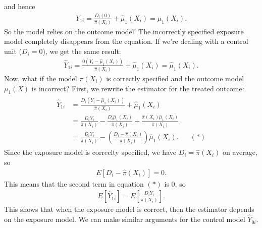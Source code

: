 \documentclass[letterpaper,10pt,english]{jupyterBook}
\begin{document}
\sphinxAtStartPar
and hence
\begin{equation*}
\begin{split}\hat Y_{1i} = \frac{D_i(0)}{\hat \pi (X_i)} + \hat \mu_1(X_i) = \hat \mu_1(X_i).\end{split}
\end{equation*}
\sphinxAtStartPar
So the model relies  on the outcome model! The incorrectly specified exposure model completely disappears from the equation. If we’re dealing with a control unit (\(D_i=0\)), we get the same result:
\begin{equation*}
\begin{split}\hat Y_{1i} = \frac{0(Y_i - \hat \mu_1 (X_i))}{\hat \pi (X_i)} + \hat \mu_1(X_i) = \hat \mu_1(X_i).\end{split}
\end{equation*}
\sphinxAtStartPar
Now, what if the  model \(\pi(X_i)\) is correctly specified and the outcome model \(\mu_1(X)\) is incorrect? First, we rewrite the estimator for the treated outcome:
\begin{equation*}
\begin{split}\begin{aligned}
\hat Y_{1i}& = \frac{D_i(Y_i - \hat \mu_1 (X_i))}{\hat \pi (X_i)} + \hat \mu_1(X_i) \\
&= \frac{D_iY_i}{\hat \pi (X_i)} - \frac{D_i\hat \mu_1 (X_i)}{\hat \pi (X_i)} + \frac{\hat \pi (X_i)\hat \mu_1(X_i)}{\hat \pi (X_i)} \\
& = \frac{D_iY_i}{\hat \pi (X_i)} - \left( \frac{D_i - \hat \pi(X_i)}{\hat \pi (X_i)}\right) \hat \mu_1(X_i). &&(*)
\end{aligned}\end{split}
\end{equation*}
\sphinxAtStartPar
Since the exposure model is correclty specified, we have \(D_i = \hat \pi(X_i)\) on average, so
\begin{equation*}
\begin{split}E[D_i - \hat \pi(X_i)] = 0.\end{split}
\end{equation*}
\sphinxAtStartPar
This means that the second term in equation \((*)\) is 0, so
\begin{equation*}
\begin{split}E[\hat Y_{1i}]= E \left [ \frac{D_iY_i}{\hat \pi (X_i)}\right].\end{split}
\end{equation*}
\sphinxAtStartPar
This shows that when the exposure model is correct, then the estimator depends  on the exposure model. We can make similar arguments for the control model \(\hat Y_{0i}\).
\end{document}
